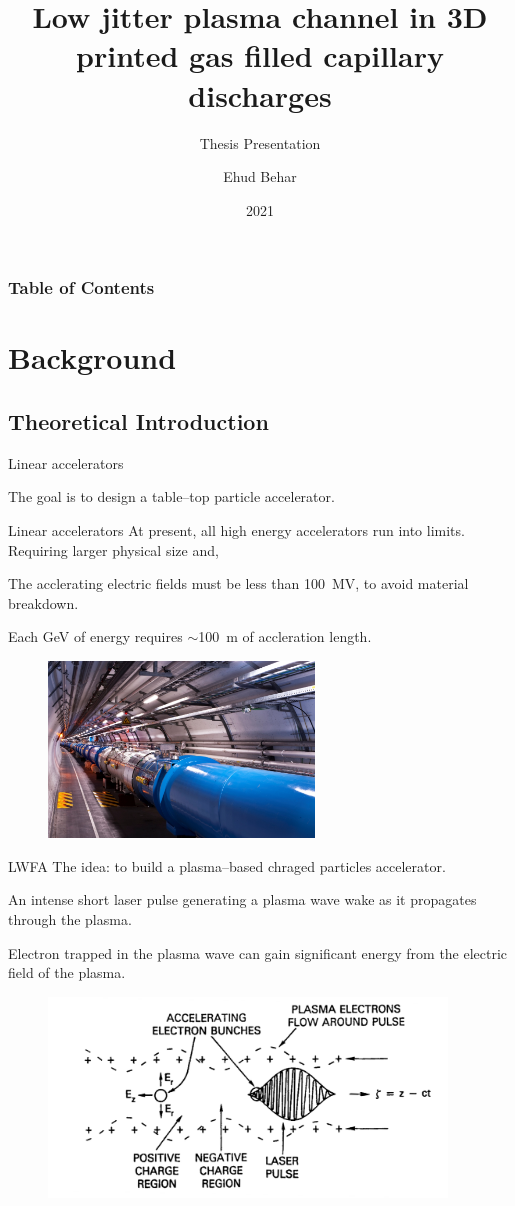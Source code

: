 \documentclass[]{beamer}
\title{Low jitter plasma channel in 3D printed gas filled capillary discharges}
\subtitle{Thesis Presentation}
\author{Ehud Behar}
\institute{Hebrew University of Jerusalem}
\date{2021}
\begin{document}
\frame{\titlepage}
\begin{frame}
\frametitle{Table of Contents}
\tableofcontents
\end{frame}

\section{Background}
\subsection{Theoretical Introduction}
  \begin{frame}{Linear accelerators}
  \begin{center}
    The goal is to design a table--top particle accelerator.
  \end{center}
  \end{frame}
  \begin{frame}{Linear accelerators}
    At present, all high energy accelerators run into limits.
    Requiring larger physical size and,

    The acclerating electric fields must be less than \SI{100}{\mega \V}, to avoid material breakdown.

    Each \si{\giga \eV} of energy requires $\sim$\SI{100}{\meter} of accleration length.
    \begin{figure}
      \includegraphics[width=200pt]{figures/lhc_cern_compressed.jpg}
    \end{figure}
  \end{frame}
  \begin{frame}{LWFA}
  The idea: to build a plasma--based chraged particles accelerator.

  An intense short laser pulse generating a plasma wave wake as it propagates through the plasma.

  Electron trapped in the plasma wave can gain significant energy from the electric field of the plasma.
  \begin{figure}
    \includegraphics[width=300pt]{figures/lwfa-schematic.PNG}
  \end{figure}
  \end{frame}
\end{document}
